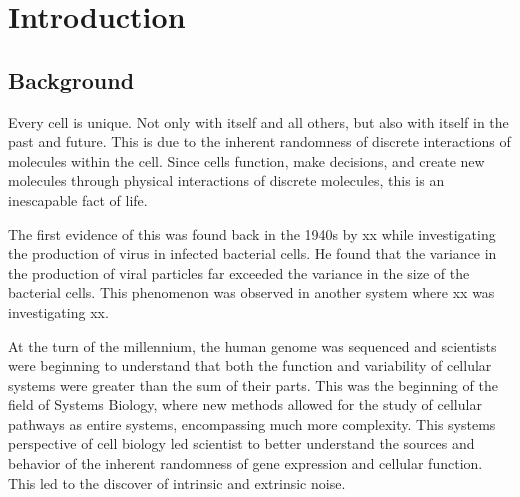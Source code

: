 \chapter{Introduction}

\section{Background}
Every cell is unique. Not only with itself and all others, but also with itself in the past and future. This is due to the inherent randomness of discrete interactions of molecules within the cell. Since cells function, make decisions, and create new molecules through physical interactions of discrete molecules, this is an inescapable fact of life.

The first evidence of this was found back in the 1940s by xx while investigating the production of virus in infected bacterial cells. He found that the variance in the production of viral particles far exceeded the variance in the size of the bacterial cells. This phenomenon was observed in another system where xx was investigating xx. 

At the turn of the millennium, the human genome was sequenced and scientists were beginning to understand that both the function and variability of cellular systems were greater than the sum of their parts. This was the beginning of the field of Systems Biology, where new methods allowed for the study of cellular pathways as entire systems, encompassing much more complexity. This systems perspective of cell biology led scientist to better understand the sources and behavior of the inherent randomness of gene expression and cellular function. This led to the discover of intrinsic and extrinsic noise.

